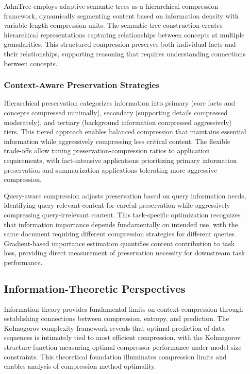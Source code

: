 AdmTree employs adaptive semantic trees as a hierarchical compression framework, dynamically segmenting content based on information density with variable-length compression units. The semantic tree construction creates hierarchical representations capturing relationships between concepts at multiple granularities. This structured compression preserves both individual facts and their relationships, supporting reasoning that requires understanding connections between concepts.

\subsubsection{Context-Aware Preservation Strategies}

Hierarchical preservation categorizes information into primary (core facts and concepts compressed minimally), secondary (supporting details compressed moderately), and tertiary (background information compressed aggressively) tiers. This tiered approach enables balanced compression that maintains essential information while aggressively compressing less critical content. The flexible trade-offs allow tuning preservation-compression ratios to application requirements, with fact-intensive applications prioritizing primary information preservation and summarization applications tolerating more aggressive compression.

Query-aware compression adjusts preservation based on query information needs, identifying query-relevant content for careful preservation while aggressively compressing query-irrelevant content. This task-specific optimization recognizes that information importance depends fundamentally on intended use, with the same document requiring different compression strategies for different queries. Gradient-based importance estimation quantifies content contribution to task loss, providing direct measurement of preservation necessity for downstream task performance.

\subsection{Information-Theoretic Perspectives}

Information theory provides fundamental limits on context compression through establishing connections between compression, entropy, and prediction. The Kolmogorov complexity framework reveals that optimal prediction of data sequences is intimately tied to most efficient compression, with the Kolmogorov structure function measuring optimal compressor performance under model-size constraints. This theoretical foundation illuminates compression limits and enables analysis of compression method optimality.

